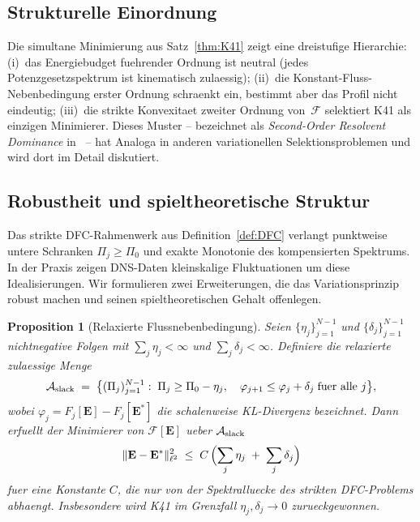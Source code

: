 \documentclass[12pt,a4paper]{article}
\theoremstyle{definition}
\theoremstyle{plain}
\newtheorem{proposition}[definition]{Proposition}
\theoremstyle{remark}
\begin{document}
\subsection{Strukturelle Einordnung}\label{sec:resolvent-cascade}

Die simultane Minimierung aus Satz~\ref{thm:K41} zeigt eine dreistufige
Hierarchie: (i)~das Energiebudget fuehrender Ordnung ist neutral (jedes
Potenzgesetzspektrum ist kinematisch zulaessig); (ii)~die
Konstant-Fluss-Nebenbedingung erster Ordnung schraenkt ein, bestimmt aber
das Profil nicht eindeutig; (iii)~die strikte Konvexitaet zweiter Ordnung
von~$\mathcal{F}$ selektiert K41 als einzigen Minimierer. Dieses Muster
-- bezeichnet als \emph{Second-Order Resolvent Dominance}
in~\cite{FST-Unified2026} -- hat Analoga in anderen variationellen
Selektionsproblemen und wird dort im Detail diskutiert.

\subsection{Robustheit und spieltheoretische Struktur}\label{sec:robustness}

Das strikte DFC-Rahmenwerk aus Definition~\ref{def:DFC} verlangt
punktweise untere Schranken $\Pi_j \ge \Pi_0$ und exakte Monotonie des
kompensierten Spektrums. In der Praxis zeigen DNS-Daten kleinskalige
Fluktuationen um diese Idealisierungen. Wir formulieren zwei
Erweiterungen, die das Variationsprinzip robust machen und seinen
spieltheoretischen Gehalt offenlegen.

\begin{proposition}[Relaxierte Flussnebenbedingung]
\label{prop:dfc-slack}
Seien $\{\eta_j\}_{j=1}^{N-1}$ und $\{\delta_j\}_{j=1}^{N-1}$
nichtnegative Folgen mit $\sum_j \eta_j < \infty$ und
$\sum_j \delta_j < \infty$. Definiere die \emph{relaxierte zulaessige
Menge}
\[
  \mathcal{A}_{\textup{slack}}
  \;=\;
  \bigl\{
    (\Pi_j)_{j=1}^{N-1} :\;
    \Pi_j \ge \Pi_0 - \eta_j,\quad
    \varphi_{j+1} \le \varphi_j + \delta_j
    \;\text{fuer alle } j
  \bigr\},
\]
wobei $\varphi_j = F_j[\mathbf{E}] - F_j[\mathbf{E}^*]$ die
schalenweise KL-Divergenz bezeichnet. Dann erfuellt der Minimierer von
$\mathcal{F}[\mathbf{E}]$ ueber $\mathcal{A}_{\textup{slack}}$
\begin{equation}\label{eq:dfc-slack-bound}
  \|\mathbf{E} - \mathbf{E}^*\|_{\ell^2}^2
  \;\le\;
  C\,\Bigl(\sum_j \eta_j \;+\; \sum_j \delta_j\Bigr)
\end{equation}
fuer eine Konstante $C$, die nur von der Spektralluecke des
strikten DFC-Problems abhaengt. Insbesondere wird K41 im Grenzfall
$\eta_j, \delta_j \to 0$ zurueckgewonnen.
\end{proposition}
\end{document}
